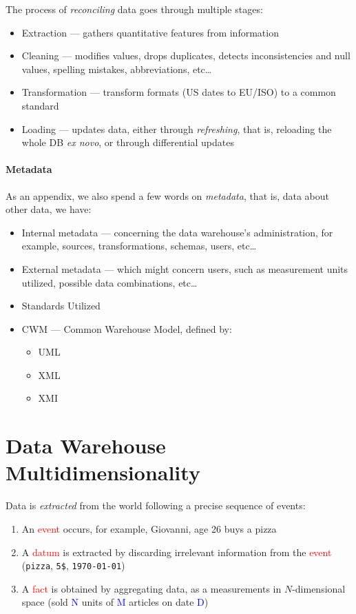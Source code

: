 \documentclass[openright, twoside, twocolumn, a4paper, 10pt]{report}
\begin{document}
The process of \emph{reconciling} data goes through multiple stages:

\begin{itemize}
	\item Extraction --- gathers quantitative features from information
	\item Cleaning --- modifies values, drops duplicates, detects inconsistencies and
	      null values, spelling mistakes, abbreviations, etc\dots
	\item Transformation --- transform formats (US dates to EU/ISO) to a common
	      standard
	\item Loading --- updates data, either through \emph{refreshing}, that is, reloading
	      the whole DB \emph{ex novo}, or through differential updates
\end{itemize}

\paragraph{Metadata}

As an appendix, we also spend a few words on \emph{metadata}, that is, data
about other data, we have:

\begin{itemize}
	\item Internal metadata --- concerning the data warehouse's administration, for example,
	      sources, transformations, schemas, users, etc\dots
	\item External metadata --- which might concern users, such as measurement units utilized, possible
	      data combinations, etc\dots
	\item Standards Utilized
	\item CWM --- Common Warehouse Model, defined by:
	      \begin{itemize}
		      \item UML
		      \item XML
		      \item XMI
	      \end{itemize}
\end{itemize}

\section{Data Warehouse Multidimensionality}

Data is \emph{extracted} from the world following a precise sequence of
events:

\begin{enumerate}
	\item An \textcolor{red}{event} occurs, for example, Giovanni, age 26 buys a pizza
	\item A \textcolor{red}{datum} is extracted by discarding irrelevant
	      information from the \textcolor{red}{event} (\texttt{pizza}, \texttt{5\$}, \texttt{\today})
	\item A \textcolor{red}{fact} is obtained by aggregating data, as a measurements
	      in $N$-dimensional space (sold \textcolor{blue}{N} units of \textcolor{blue}{M} articles
	      on date \textcolor{blue}{D})
\end{enumerate}
\end{document}
